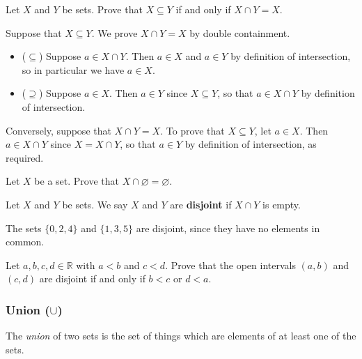 \begin{proposition}
\label{propSubsetFromIntersection}
Let $X$ and $Y$ be sets. Prove that $X \subseteq Y$ if and only if $X \cap Y = X$.
\end{proposition}

\begin{cproof}
Suppose that $X \subseteq Y$. We prove $X \cap Y = X$ by double containment.
\begin{itemize}
\item ($\subseteq$) Suppose $a \in X \cap Y$. Then $a \in X$ and $a \in Y$ by definition of intersection, so in particular we have $a \in X$.
\item ($\supseteq$) Suppose $a \in X$. Then $a \in Y$ since $X \subseteq Y$, so that $a \in X \cap Y$ by definition of intersection.
\end{itemize}

Conversely, suppose that $X \cap Y = X$. To prove that $X \subseteq Y$, let $a \in X$. Then $a \in X \cap Y$ since $X = X \cap Y$, so that $a \in Y$ by definition of intersection, as required.
\end{cproof}

\begin{exercise}
Let $X$ be a set. Prove that $X \cap \varnothing = \varnothing$.
\end{exercise}

\begin{definition}
Let $X$ and $Y$ be sets. We say $X$ and $Y$ are \textbf{disjoint} if $X \cap Y$ is empty.
\end{definition}

\begin{example}
The sets $\{ 0,2,4 \}$ and $\{ 1,3,5 \}$ are disjoint, since they have no elements in common.
\end{example}

\begin{exercise}
Let $a,b,c,d \in \mathbb{R}$ with $a<b$ and $c<d$. Prove that the open intervals $(a,b)$ and $(c,d)$ are disjoint if and only if $b<c$ or $d<a$.
\end{exercise}

\subsubsection*{Union ($\cup$)}
The \textit{union} of two sets is the set of things which are elements of at least one of the sets.

